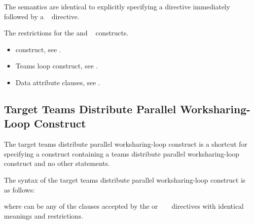 \descr
The semantics are identical to explicitly specifying a 
directive immediately followed by a ~ directive.

\restrictions
The restrictions for the  and ~ constructs.

\crossreferences
\begin{itemize}
\item {} construct, see .

\item Teams loop construct, see .

\item Data attribute clauses, see .
\end{itemize}



\subsection{Target Teams Distribute Parallel Worksharing-Loop Construct}
\label{subsec:Target Teams Distribute Parallel Worksharing-Loop Construct}
\summary
The target teams distribute parallel worksharing-loop construct is a shortcut 
for specifying a  construct containing a teams distribute parallel 
worksharing-loop construct and no other statements.

\syntax
\begin{ccppspecific}
The syntax of the target teams distribute parallel worksharing-loop construct is 
as follows:

\begin{ompcPragma}[fontsize=\small]
#pragma omp target teams distribute parallel for \plc{\}
            \plc{[clause[ [},\plc{] clause] ... ] new-line}
    \plc{for-loops}
\end{ompcPragma}

where  can be any of the clauses accepted by the  or
~ ~ directives with identical
meanings and restrictions.
\end{ccppspecific}

